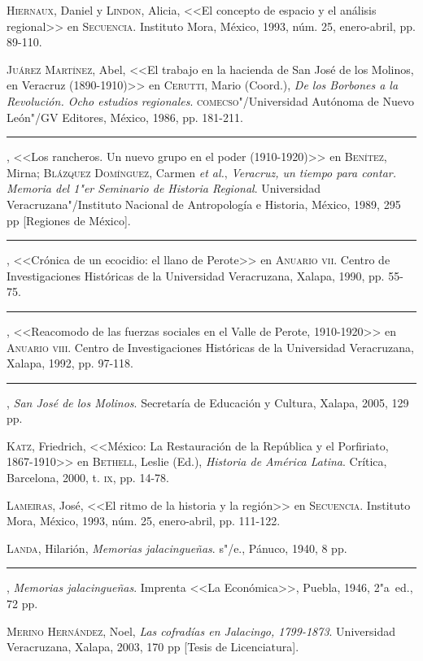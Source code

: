 \documentclass[14pt,twoside,final]{extbook} %
\begin{document}
\textsc{Hiernaux}, Daniel y \textsc{Lindon}, Alicia, <<El concepto de espacio y el análisis regional>> en \textsc{Secuencia}. Instituto Mora, México, 1993, núm. 25, enero-abril, pp. 89-110.

\textsc{Juárez Martínez}, Abel, <<El trabajo en la hacienda de San José de los Molinos, en Veracruz (1890-1910)>> en \textsc{Cerutti}, Mario (Coord.), \emph{De los Borbones a la
Revolución. Ocho estudios regionales}. \textsc{comecso}"/Universidad Autónoma de Nuevo León"/GV Editores, México, 1986, pp. 181-211.

\rule{1cm}{0.4pt}, <<Los rancheros. Un nuevo grupo en el poder (1910-1920)>> en \textsc{Benítez}, Mirna; \textsc{Blázquez Domínguez}, Carmen \emph{et al.}, \emph{Veracruz, un tiempo para contar. Memoria del 1"er Seminario de Historia Regional}. Universidad Veracruzana"/Instituto Nacional de Antropología e Historia, México, 1989, 295 pp [Regiones de México].

\rule{1cm}{0.4pt}, <<Crónica de un ecocidio: el llano de Perote>> en \textsc{Anuario vii}. Centro de Investigaciones Históricas de la Universidad Veracruzana, Xalapa, 1990, pp. 55-75.

\rule{1cm}{0.4pt}, <<Reacomodo de las fuerzas sociales en el Valle de Perote, 1910-1920>> en \textsc{Anuario viii}. Centro de Investigaciones Históricas de la Universidad Veracruzana, Xalapa, 1992, pp. 97-118.

\rule{1cm}{0.4pt}, \emph{San José de los Molinos}. Secretaría de Educación y Cultura, Xalapa, 2005, 129 pp.

\textsc{Katz}, Friedrich, <<México: La Restauración de la República y el Porfiriato, 1867-1910>> en \textsc{Bethell}, Leslie (Ed.), \emph{Historia de América Latina}. Crítica, Barcelona, 2000, t. \textsc{ix}, pp. 14-78.

\textsc{Lameiras}, José, <<El ritmo de la historia y la región>> en \textsc{Secuencia}. Instituto Mora, México, 1993, núm. 25, enero-abril, pp. 111-122.

\textsc{Landa}, Hilarión, \emph{Memorias jalacingueñas}. s"/e., Pánuco, 1940, 8 pp.

\rule{1cm}{0.4pt}, \emph{Memorias jalacingueñas}. Imprenta <<La Económica>>, Puebla, 1946, 2"a~ed., 72 pp.

\textsc{Merino Hernández}, Noel, \emph{Las cofradías en Jalacingo, 1799-1873}. Universidad Veracruzana, Xalapa, 2003, 170 pp [Tesis de Licenciatura].
\end{document}
